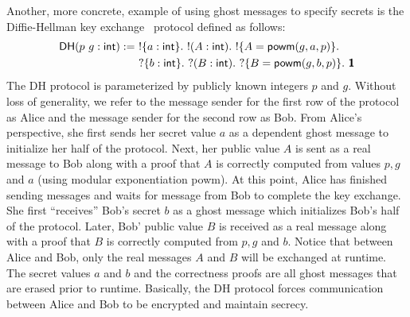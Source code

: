 Another, more concrete, example of using ghost messages to specify secrets is the
Diffie-Hellman key exchange~\cite{DH76} protocol defined as follows:
\begin{align*}
  \textsf{DH}(p\ g: \textsf{int})
  :=\ & !\{a: \textsf{int}\}.\ !(A: \textsf{int}).\ !\{A = \textsf{powm}(g, a, p)\}.\\
      & ?\{b: \textsf{int}\}.\ ?(B: \textsf{int}).\ ?\{B = \textsf{powm}(g, b, p)\}.\ \textbf{\textsf{1}}
\end{align*}
The \textsf{DH} protocol is parameterized by publicly known integers $p$ and $g$.
Without loss of generality, we refer to the message sender for the first row of the
protocol as Alice and the message sender for the second row as Bob. From Alice's
perspective, she first sends her secret value $a$ as a dependent ghost message to
initialize her half of the protocol. Next, her public value $A$ is sent as a real
message to Bob along with a proof that $A$ is correctly computed from values $p, g$ and $a$
(using modular exponentiation \textsf{powm}). At this point, Alice has finished sending
messages and waits for message from Bob to complete the key exchange. She first
``receives'' Bob's secret $b$ as a ghost message which initializes Bob's half of the
protocol. Later, Bob' public value $B$ is received as a real message along with a proof
that $B$ is correctly computed from $p, g$ and $b$. Notice that between Alice and Bob,
only the real messages $A$ and $B$ will be exchanged at runtime. The secret values
$a$ and $b$ and the correctness proofs are all ghost messages that are erased prior to
runtime. Basically, the \textsf{DH} protocol forces communication between Alice and Bob
to be encrypted and maintain secrecy.


